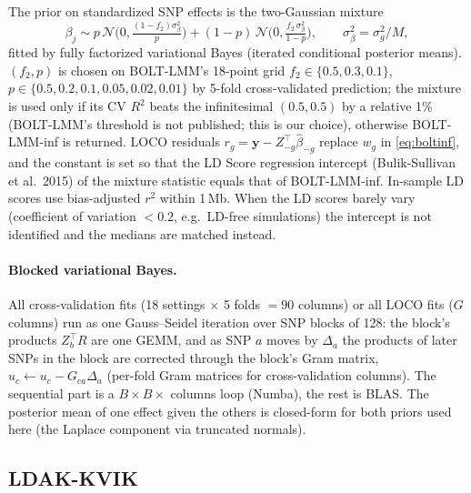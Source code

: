 \documentclass[11pt]{article}
\newcommand{\y}{\mathbf{y}}
\begin{document}
The prior on standardized SNP effects is the two-Gaussian mixture
\begin{equation}
  \beta_j \sim p\,\mathcal{N}\!\Big(0, \tfrac{(1-f_2)\sigma_\beta^2}{p}\Big)
  + (1-p)\,\mathcal{N}\!\Big(0, \tfrac{f_2\,\sigma_\beta^2}{1-p}\Big),
  \qquad \sigma_\beta^2 = \sigma_g^2 / M,
\end{equation}
fitted by fully factorized variational Bayes (iterated conditional
posterior means). $(f_2, p)$ is chosen on BOLT-LMM's 18-point grid
$f_2 \in \{0.5, 0.3, 0.1\}$, $p \in \{0.5, 0.2, 0.1, 0.05, 0.02, 0.01\}$ by
5-fold cross-validated prediction; the mixture is used only if its CV
$R^2$ beats the infinitesimal $(0.5, 0.5)$ by a relative 1\% (BOLT-LMM's
threshold is not published; this is our choice), otherwise BOLT-LMM-inf
is returned. LOCO residuals
$r_g = \y - Z_{-g}^\top\hat\beta_{-g}$ replace $w_g$ in
\eqref{eq:boltinf}, and the constant is set so that the LD Score
regression intercept (Bulik-Sullivan et al.\ 2015) of the mixture
statistic equals that of BOLT-LMM-inf. In-sample LD scores use
bias-adjusted $r^2$ within 1\,Mb. When the LD scores barely vary
(coefficient of variation $< 0.2$, e.g.\ LD-free simulations) the
intercept is not identified and the medians are matched instead.

\paragraph{Blocked variational Bayes.} All cross-validation fits
(18 settings $\times$ 5 folds $= 90$ columns) or all LOCO fits ($G$
columns) run as one Gauss--Seidel iteration over SNP blocks of 128: the
block's products $Z_b^\top R$ are one GEMM, and as SNP $a$ moves by
$\Delta_a$ the products of later SNPs in the block are corrected
through the block's Gram matrix, $u_c \gets u_c - G_{ca}\Delta_a$
(per-fold Gram matrices for cross-validation columns). The sequential
part is a $B \times B \times$ columns loop (Numba), the rest is BLAS.
The posterior mean of one effect given the others is closed-form for
both priors used here (the Laplace component via truncated normals).

\subsection{LDAK-KVIK}
\end{document}
